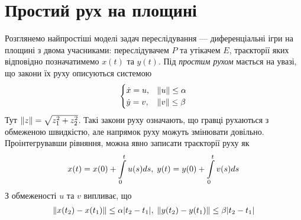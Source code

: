 
\section{Простий рух на площині}
Розглянемо найпростіші моделі задач переслідування --- диференціальні ігри на площині з двома учасниками:
переслідувачем $P$ та утікачем $E$, траєкторії яких відповідно позначатимемо $x(t)$ та $y(t)$.
Під \emph{простим рухом} мається на увазі, що закони їх руху описуються системою
\begin{gather}
    \begin{cases}
        \dot{x} = u, & \Vert u \Vert \leq \alpha \\
        \dot{y} = v, & \Vert v \Vert \leq \beta 
    \end{cases}
\end{gather}
Тут $\Vert z \Vert = \sqrt{z_1^2 + z_2^2}$. Такі закони руху означають, що гравці рухаються з обмеженою швидкістю,
але напрямок руху можуть змінювати довільно. Проінтегрувавши рівняння, можна явно записати траєкторії руху як
\begin{gather*}
    x(t) = x(0) + \int\limits_0^t u(s) ds, \;
    y(t) = y(0) + \int\limits_0^t v(s) ds
\end{gather*}
З обмеженості $u$ та $v$ випливає, що 
\begin{gather*}
    \Vert x(t_2) - x(t_1) \Vert \leq \alpha |t_2 - t_1|, \;
    \Vert y(t_2) - y(t_1) \Vert \leq \beta |t_2 - t_1|
\end{gather*}

